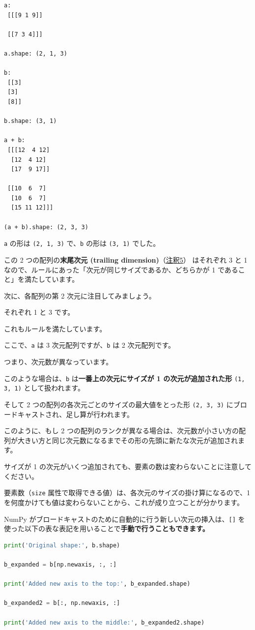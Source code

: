 \begin{lstlisting}[style=outputcell]
a:
 [[[9 1 9]]

 [[7 3 4]]]

a.shape: (2, 1, 3)

b:
 [[3]
 [3]
 [8]]

b.shape: (3, 1)

a + b:
 [[[12  4 12]
  [12  4 12]
  [17  9 17]]

 [[10  6  7]
  [10  6  7]
  [15 11 12]]]

(a + b).shape: (2, 3, 3)
\end{lstlisting}

\texttt{a} の形は \texttt{(2, 1, 3)} で、\texttt{b} の形は \texttt{(3, 1)} でした。

この 2 つの配列の\textbf{末尾次元 (trailing dimension)}（\hyperref[03-reviewing-elementary-math-with-numpy-and-matplotlib-note5]{注釈5}） はそれぞれ 3 と 1 なので、ルールにあった「次元が同じサイズであるか、どちらかが 1 であること」を満たしています。


次に、各配列の第 2 次元に注目してみましょう。

それぞれ 1 と 3 です。

これもルールを満たしています。


ここで、\texttt{a} は 3 次元配列ですが、\texttt{b} は 2 次元配列です。

つまり、次元数が異なっています。

このような場合は、\texttt{b} は\textbf{一番上の次元にサイズが 1 の次元が追加された形} \texttt{(1, 3, 1)} として扱われます。

そして 2 つの配列の各次元ごとのサイズの最大値をとった形 \texttt{(2, 3, 3)} にブロードキャストされ、足し算が行われます。


このように、もし 2 つの配列のランクが異なる場合は、次元数が小さい方の配列が大きい方と同じ次元数になるまでその形の先頭に新たな次元が追加されます。

サイズが 1 の次元がいくつ追加されても、要素の数は変わらないことに注意してください。

要素数（\texttt{size} 属性で取得できる値）は、各次元のサイズの掛け算になるので、1 を何度かけても値は変わらないことから、これが成り立つことが分かります。


NumPy がブロードキャストのために自動的に行う新しい次元の挿入は、\texttt{[]} を使った以下の表な表記を用いることで\textbf{手動で行うこともできます。}


\begin{lstlisting}[style=codecell,language=Python]
print('Original shape:', b.shape)

b_expanded = b[np.newaxis, :, :]

print('Added new axis to the top:', b_expanded.shape)

b_expanded2 = b[:, np.newaxis, :]

print('Added new axis to the middle:', b_expanded2.shape)
\end{lstlisting}

